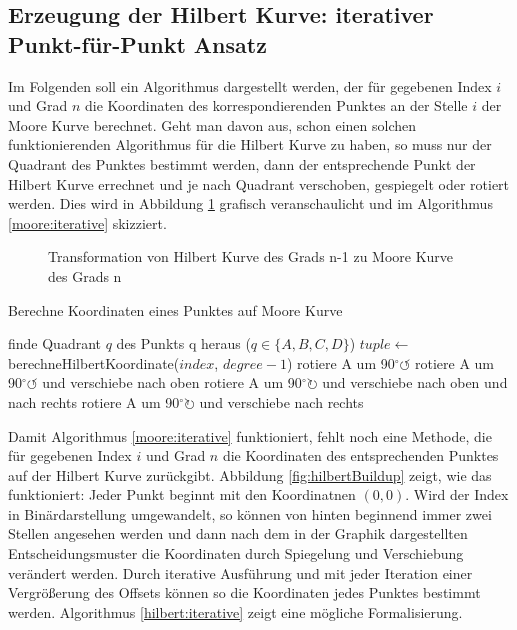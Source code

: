 \documentclass[course=erap]{aspdoc}
\begin{document}
\subsection{Erzeugung der Hilbert Kurve: iterativer Punkt-für-Punkt Ansatz}
Im Folgenden soll ein Algorithmus dargestellt werden, der für gegebenen Index $i$ und Grad $n$ die Koordinaten des korrespondierenden Punktes an der Stelle $i$ der Moore Kurve berechnet.
Geht man davon aus, schon einen solchen funktionierenden Algorithmus für die Hilbert Kurve zu haben, so muss nur der Quadrant des Punktes bestimmt werden, dann der entsprechende Punkt der Hilbert Kurve errechnet und je nach Quadrant verschoben, gespiegelt oder rotiert werden. Dies wird in Abbildung \ref{HilbertZuMoore} grafisch veranschaulicht und im Algorithmus \ref{moore:iterative} skizziert.
\newline
\begin{figure}[h]
\centering
\def\svgwidth{240pt}

\caption{Transformation von Hilbert Kurve des Grads n-1 zu Moore Kurve des Grads n}
\label{HilbertZuMoore}
\end{figure}
\begin{algorithm}[H]
\begin{algorithmic}
\caption{Berechne Koordinaten eines Punktes auf Moore Kurve}
\label{moore:iterative}
	\State finde Quadrant $q$ des Punkts q heraus ($q \in \{A, B, C, D\}$)
	\State $tuple \leftarrow$ berechneHilbertKoordinate($index$, $degree-1$)
		\State rotiere A um 90$^{\circ} \circlearrowleft$
		\State rotiere A um 90$^{\circ}\circlearrowleft$ und verschiebe nach oben
		\State rotiere A um 90$^{\circ}\circlearrowright$ und verschiebe nach oben und nach rechts
		\State rotiere A um  90$^{\circ} \circlearrowright$ und verschiebe nach rechts
	\EndIf
\EndFunction
{}
	\State [...]
\EndFunction
\end{algorithmic}
\end{algorithm}
Damit Algorithmus \ref{moore:iterative} funktioniert, fehlt noch eine Methode, die für gegebenen Index $i$ und Grad $n$ die Koordinaten des entsprechenden Punktes auf der Hilbert Kurve zurückgibt. Abbildung \ref{fig:hilbertBuildup} zeigt, wie das funktioniert: Jeder Punkt beginnt mit den Koordinatnen $(0, 0)$. Wird der Index in Binärdarstellung umgewandelt, so können von hinten beginnend immer zwei Stellen angesehen werden und dann nach dem in der Graphik dargestellten Entscheidungsmuster die Koordinaten durch Spiegelung und Verschiebung verändert werden. Durch iterative Ausführung und mit jeder Iteration einer Vergrößerung des Offsets können so die Koordinaten jedes Punktes bestimmt werden. Algorithmus \ref{hilbert:iterative} zeigt eine mögliche Formalisierung.
\end{document}
